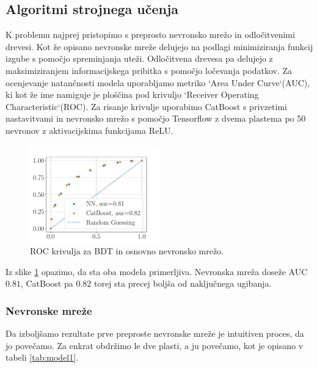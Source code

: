 \documentclass{article}
\begin{document}
\subsection{Algoritmi strojnega učenja}
K problemu najprej pristopimo s preprosto nevronsko mrežo in odločitvenimi drevesi. Kot že opisano nevronske mreže delujejo na podlagi minimiziranja funkcij izgube s pomočjo spreminjanja uteži. Odločitvena drevesa pa delujejo z maksimiziranjem informacijskega pribitka s pomočjo ločevanja podatkov. Za ocenjevanje natančnosti modela uporabljamo metriko `Area Under Curve`(AUC), ki kot že ime namiguje je ploščina pod krivuljo `Receiver Operating Characteristic`(ROC). Za risanje krivulje uporabimo CatBoost s privzetimi nastavitvami in nevronsko mrežo s pomočjo Tensorflow z dvema plastema po 50 nevronov z aktivacijskima funkcijama ReLU. 
\begin{figure}[H]
\centering
	\includegraphics[width=0.5\textwidth]{images/roc.pdf}
	\caption{ROC krivulja za BDT in osnovno nevronsko mrežo.}
	\label{fig:roc}
\end{figure}
Iz slike \ref{fig:roc} opazimo, da sta oba modela primerljiva. Nevronska mreža doseže AUC $0.81$, CatBoost pa $0.82$ torej sta precej boljša od naključnega ugibanja. 
\subsubsection{Nevronske mreže}
Da izboljšamo rezultate prve preproste nevronske mreže je intuitiven proces, da jo povečamo. Za enkrat obdržimo le dve plasti, a ju povečamo, kot je opisano v tabeli \ref{tab:model1}.
\end{document}

